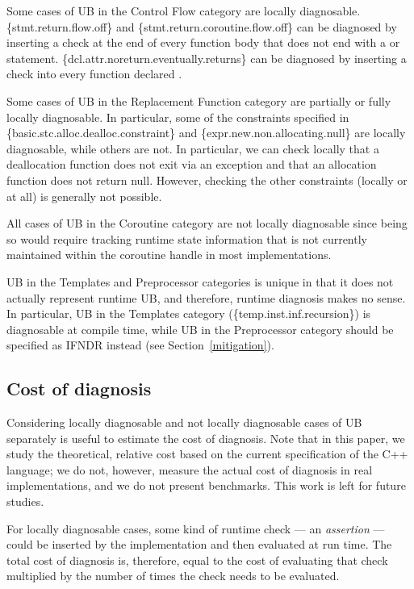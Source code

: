Some cases of UB in the Control Flow category are locally diagnosable. \{stmt.return.flow.off\} and \{stmt.return.coroutine.flow.off\} can be diagnosed by inserting a check at the end of every function body that does not end with a  or  statement. \{dcl.attr.noreturn.eventually.returns\} can be diagnosed by inserting a check into every function declared \tcode{[[noreturn]]}.

Some cases of UB in the Replacement Function category are partially or fully locally diagnosable. In particular, some of the constraints specified in \{basic.stc.alloc.dealloc.constraint\} and \{expr.new.non.allocating.null\} are locally diagnosable, while others are not. In particular, we can check locally that a deallocation function does not exit via an exception and that an allocation function does not return null. However, checking the other constraints (locally or at all) is generally not possible.

All cases of UB in the Coroutine category are not locally diagnosable since being so would require tracking runtime state information that is not currently maintained within the coroutine handle in most implementations.

UB in the Templates and Preprocessor categories is unique in that it does not actually represent runtime UB, and therefore, runtime diagnosis makes no sense. In particular, UB in the Templates category (\{temp.inst.inf.recursion\}) is diagnosable at compile time, while UB in the Preprocessor category should be specified as IFNDR instead (see Section~\ref{mitigation}).

\subsection{Cost of diagnosis}
\label{cost}

Considering locally diagnosable and not locally diagnosable cases of UB separately is useful to estimate the cost of diagnosis. Note that in this paper, we study the theoretical, relative cost based on the current specification of the C++ language; we do not, however, measure the actual cost of diagnosis in real implementations, and we do not present benchmarks. This work is left for future studies. %

For locally diagnosable cases, some kind of runtime check --- an \emph{assertion} --- could be inserted by the implementation and then evaluated at run time. The total cost of diagnosis is, therefore, equal to the cost of evaluating that check multiplied by the number of times the check needs to be evaluated.

